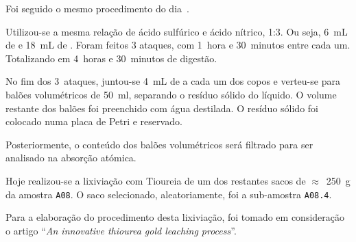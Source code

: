 Foi seguido o mesmo procedimento do dia~.

Utilizou-se a mesma relação de ácido sulfúrico e ácido nítrico, 1:3.
Ou seja, 6~mL de  e 18~mL de .
Foram feitos 3 ataques, com 1~hora e 30~minutos entre cada um.
Totalizando em 4~horas e 30~minutos de digestão.

No fim dos 3~ataques, juntou-se 4~mL de  a cada um dos copos e verteu-se para balões volumétricos de 50~ml, separando o resíduo sólido do líquido.
O volume restante dos balões foi preenchido com água destilada.
O resíduo sólido foi colocado numa placa de Petri e reservado.

Posteriormente, o conteúdo dos balões volumétricos será filtrado para ser analisado na absorção atómica.

\hrulefill



Hoje realizou-se a lixiviação com Tioureia de um dos restantes sacos de $\approx$~250~g da amostra \texttt{A08}.
O saco selecionado, aleatoriamente, foi a sub-amostra \texttt{A08.4}.

Para a elaboração do procedimento desta lixiviação, foi tomado em consideração o artigo ``\emph{An innovative thiourea gold leaching process}''\cite{innovative_thiourea_1998}.